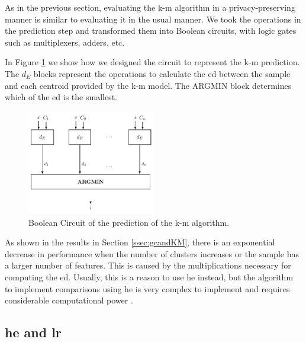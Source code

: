 As in the previous section, evaluating the \ac{k-m} algorithm in a privacy-preserving manner is similar to evaluating it in the usual manner. We took the operations in the prediction step and transformed them into Boolean circuits, with logic gates such as multiplexers, adders, etc.

In Figure \ref{fig:kmeans} we show how we designed the circuit to represent the \ac{k-m} prediction. The $d_E$ blocks represent the operations to calculate the \ac{ed} between the sample and each centroid provided by the \ac{k-m} model. The ARGMIN block determines which of the \ac{ed} is the smallest.


\begin{figure}[ht]
  \centering
  \includegraphics[width=0.50\textwidth]{images/k-means.pdf}
  \caption{Boolean Circuit of the prediction of the \ac{k-m} algorithm.}
  \label{fig:kmeans}
\end{figure}


As shown in the results in Section \ref{ssec:gcandKM}, there is an exponential decrease in performance when the number of clusters increases or the sample has a larger number of features. This is caused by the multiplications necessary for computing the \ac{ed}. Usually, this is a reason to use \ac{he} instead, but the algorithm to implement comparisons using \ac{he} is very complex to implement and requires considerable computational power \cite{blake2004strong}.




\subsection{\acl{he} and \acl{lr}}
\label{ssec:HEandLR}


